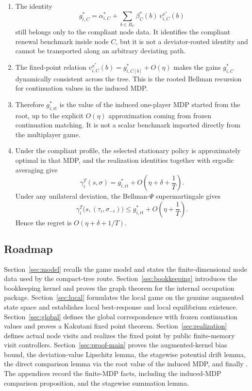 \documentclass[12pt]{article}
\theoremstyle{definition}
\newcommand{\1}{\mathbf{1}}
\begin{document}
\begin{enumerate}[label=\textnormal{(\arabic*)},leftmargin=2.4em]
\item The identity
\[
g_{i,C}^*
=
\alpha_{i,C}^*
+
\sum_{b\in B_C}\beta_C^*(b)\,v_{i,C}^{x^*}(b)
\]
still belongs only to the compliant node data. It identifies the compliant
renewal benchmark inside node $C$, but it is not a deviator-routed identity and
cannot be transported along an arbitrary deviating path.

\item The fixed-point relation
\(v_{i,C}^{x^*}(b)=g_{i,C[b]}^*+O(\eta)\)
makes the gains $g_{i,C}^*$ dynamically consistent across the tree. This is the
rooted Bellman recursion for continuation values in the induced MDP.

\item Therefore $g_{i,\mathrm{rt}}^*$ is the value of the induced one-player
MDP started from the root, up to the explicit $O(\eta)$ approximation coming
from frozen continuation matching. It is not a scalar benchmark imported
directly from the multiplayer game.

\item Under the compliant profile, the selected stationary policy is
approximately optimal in that MDP, and the realization identities together with
ergodic averaging give
\[
\gamma_i^T(s,\sigma)
=
g_{i,\mathrm{rt}}^*+O\!\left(\eta+\delta+\frac1T\right).
\]
Under any unilateral deviation, the Bellman-$\Psi$ supermartingale gives
\[
\gamma_i^T\bigl(s,(\tau_i,\sigma_{-i})\bigr)
\le
g_{i,\mathrm{rt}}^*+O\!\left(\eta+\frac1T\right).
\]
Hence the regret is $O(\eta+\delta+1/T)$.
\end{enumerate}

\subsection{Roadmap}



Section~\ref{sec:model} recalls the game model and states the finite-dimensional
node data used by the compact-tree route. Section~\ref{sec:bookkeeping}
introduces the bookkeeping kernel and proves the graph theorem for the internal
occupation package. Section~\ref{sec:local} formulates the local game on the
genuine augmented state space and establishes local best-response and local
equilibrium existence. Section~\ref{sec:global} defines the global correspondence
with frozen continuation values and proves a Kakutani fixed point theorem.
Section~\ref{sec:realization} defines actual node visits and realizes the fixed
point by public finite-memory visit controllers. Section~\ref{sec:proof-main}
proves the augmented-kernel bias bound, the deviation-value Lipschitz lemma, the
stagewise potential drift lemma, the direct comparison lemma via the
root value of the induced MDP, and finally . The appendices
record the finite-MDP facts, including the induced-MDP comparison proposition,
and the stagewise summation lemma.
\end{document}
